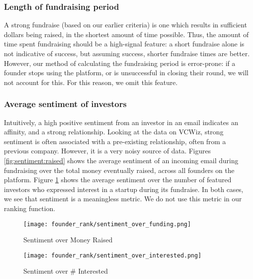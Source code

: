 \subsubsection{Length of fundraising period}

A strong fundraise (based on our earlier criteria) is one which results in sufficient dollars being raised, in the shortest amount of time possible. Thus, the amount of time spent fundraising should be a high-signal feature: a short fundraise alone is not indicative of success, but assuming success, shorter fundraise times are better. However, our method of calculating the fundraising period is error-prone: if a founder stops using the platform, or is unsuccessful in closing their round, we will not account for this. For this reason, we omit this feature.

\subsubsection{Average sentiment of investors}

Intuitively, a high positive sentiment from an investor in an email indicates an affinity, and a strong relationship. Looking at the data on VCWiz, strong sentiment is often associated with a pre-existing relationship, often from a previous company. However, it is a very noisy source of data. Figures \ref{fig:sentiment:raised} shows the average sentiment of an incoming email during fundraising over the total money eventually raised, across all founders on the platform. Figure \ref{fig:sentiment:interested} shows the average sentiment over the number of featured investors who expressed interest in a startup during its fundraise. In both cases, we see that sentiment is a meaningless metric. We do not use this metric in our ranking function.

\begin{figure}[ht]
  \centering
  \begin{minipage}[t]{0.48\textwidth}
    \centering
    \texttt{[image: founder\_rank/sentiment\_over\_funding.png]}
    \caption{Sentiment over Money Raised}
    \label{fig:sentiment:raised}
  \end{minipage}\hfill
  \begin{minipage}[t]{0.48\textwidth}
    \centering
    \texttt{[image: founder\_rank/sentiment\_over\_interested.png]}
    \caption{Sentiment over \# Interested}
    \label{fig:sentiment:interested}
  \end{minipage}
\end{figure}


